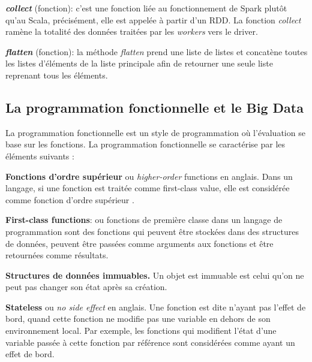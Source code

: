 \textit{\textbf{collect}} (fonction): c'est une fonction liée au fonctionnement de Spark plutôt qu'au Scala, précisément, elle est appelée à partir d'un RDD.    La fonction \textit{collect} ramène la totalité des données traitées par les \textit{workers} vers le driver.\par

\textit{\textbf{flatten}} (fonction): la méthode \textit{flatten}  prend une liste de listes et concatène toutes les listes d'éléments de la liste principale afin de retourner une seule liste reprenant tous les éléments. 

\subsection{La programmation fonctionnelle et le Big Data}

La programmation fonctionnelle est un style de programmation où l'évaluation se base sur les fonctions.  La programmation fonctionnelle se caractérise par les éléments suivants \cite{bigdatafunctional} :

\textbf{Fonctions d'ordre supérieur} ou  \textit{higher-order} functions en anglais. Dans un langage, si une fonction est traitée comme first-class value, elle est considérée comme fonction d'ordre supérieur \cite{DBLP:journals/csur/Hudak89}.
\begin{tcolorbox}
	\textbf{First-class functions}: ou fonctions de première classe dans un langage de programmation sont des fonctions qui peuvent être stockées dans des structures de données, peuvent être passées comme arguments aux fonctions et être retournées comme résultats.
\end{tcolorbox}
\par
\textbf{Structures de données immuables.} Un objet est immuable est celui qu'on ne peut pas changer son état après sa création. \par
\textbf{Stateless} ou \textit{no side effect} en anglais.  Une fonction est dite n'ayant pas  l'effet de bord, quand cette fonction ne modifie pas une variable en dehors de son environnement local. Par exemple, les fonctions qui modifient l'état d'une variable passée à cette fonction par référence sont considérées comme ayant un effet de bord.\par

